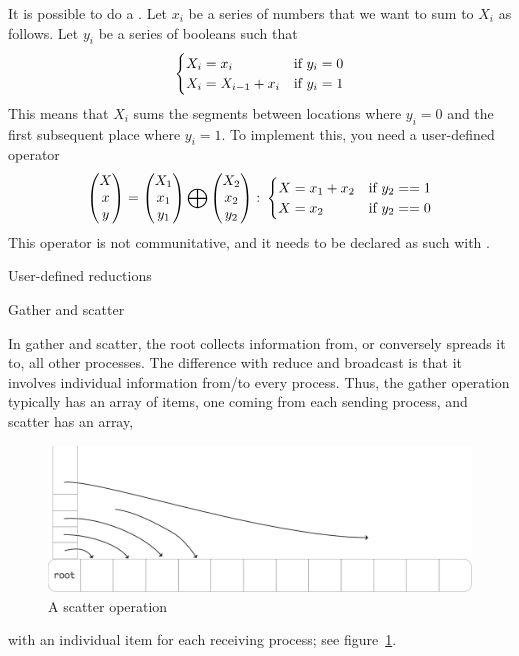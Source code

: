 It is possible to do a . Let $x_i$ be a series of numbers
that we want to sum to $X_i$ as follows. Let $y_i$ be a series of booleans such that
\[ 
\begin{cases}
  X_i=x_i&\hbox{if $y_i=0$}\\
  X_i=X_{i-1}+x_i&\hbox{if $y_i=1$}
\end{cases}
\]
This means that $X_i$ sums the segments between locations where $y_i=0$ and the
first subsequent place where $y_i=1$. To implement this, you need a user-defined operator
\[ 
\begin{pmatrix}  X\\ x\\ y\end{pmatrix}
=
\begin{pmatrix}  X_1\\ x_1\\ y_1\end{pmatrix}
\bigoplus
\begin{pmatrix}  X_2\\ x_2\\ y_2\end{pmatrix}\colon
  \begin{cases}
    X=x_1+x_2&\hbox{if $y_2==1$}\\ X=x_2&\hbox{if $y_2==0$}
  \end{cases}
\]
This operator is not communitative, and it needs to be declared as such
with .

 {User-defined reductions}
\label{mpi:op-create}

 {Gather and scatter}

In gather and scatter, the root collects information from, or conversely spreads it to,
all other processes. The difference with reduce and broadcast is that it involves
individual information from/to every process. Thus, the gather operation typically 
has an array of items, one coming from each sending process, and scatter has an array,
\begin{figure}[ht]
  \includegraphics[scale=.12]{graphics-public/scatter-simple}
  \caption{A scatter operation}
  \label{fig:scatter}
\end{figure}
with an individual item for each receiving process; see figure~\ref{fig:scatter}.

